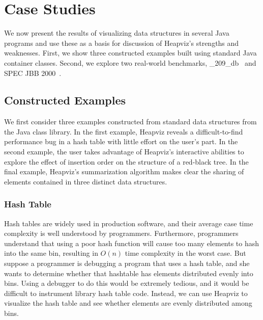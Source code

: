 

\section{Case Studies}

We now present the results of visualizing data structures in several Java
programs and use these as a basis for discussion of Heapviz's strengths and
weaknesses.  First, we show three constructed examples built using standard 
Java container classes.  Second, we explore two real-world benchmarks,
\_209\_db~\cite{specjvm98} and SPEC JBB 2000~\cite{specjbb2000}.

\subsection{Constructed Examples}

We first consider three examples constructed from standard data structures 
from the Java class library.  In the first example, Heapviz reveals a 
difficult-to-find performance bug in a hash table with little effort on the 
user's part.  In the second example, the user takes advantage of Heapviz's 
interactive abilities to explore the effect of insertion order on the
structure of a red-black tree.  In the final example, Heapviz's summarization
algorithm makes clear the sharing of elements contained in three distinct
data structures.

\subsubsection{Hash Table}

Hash tables are widely used in production software, and their average case 
time complexity is well understood by programmers. Furthermore, programmers
understand that using a poor hash function will cause too many elements to hash
into the same bin, resulting in $O(n)$ time complexity in the worst case.
But suppose a programmer is debugging a program that uses a hash table, and
she wants to determine whether that hashtable has elements distributed
evenly into bins. Using a debugger to do this would be extremely tedious,
and it would be difficult to instrument library hash table code.
Instead, we can use Heapviz to visualize the hash table and see whether
elements are evenly distributed among bins.

